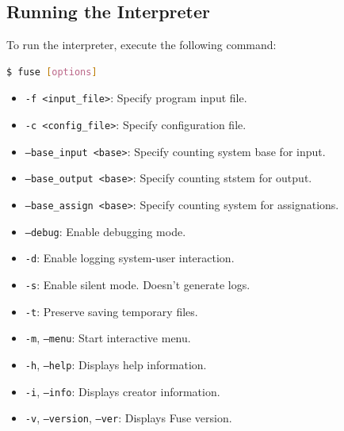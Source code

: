 \documentclass[a4paper,12pt]{article}
\begin{document}
\subsection{Running the Interpreter}
To run the interpreter, execute the following command:
\begin{lstlisting}[language=bash]
$ fuse [options]
\end{lstlisting}
\begin{itemize}
	\item \texttt{-f <input\_file>}: Specify program input file.
	\item \texttt{-c <config\_file>}: Specify configuration file.
	\item \texttt{--base\_input <base>}: Specify counting system base for input.
	\item \texttt{--base\_output <base>}: Specify counting ststem for output.
	\item \texttt{--base\_assign <base>}: Specify counting system for assignations.
	\item \texttt{--debug}: Enable debugging mode.
	\item \texttt{-d}: Enable logging system-user interaction.
	\item \texttt{-s}: Enable silent mode. Doesn't generate logs.
	\item \texttt{-t}: Preserve saving temporary files.
	\item \texttt{-m}, \texttt{--menu}: Start interactive menu.
	\item \texttt{-h}, \texttt{--help}: Displays help information.
	\item \texttt{-i}, \texttt{--info}: Displays creator information.
	\item \texttt{-v}, \texttt{--version}, \texttt{--ver}: Displays Fuse version.
\end{itemize}
\end{document}
